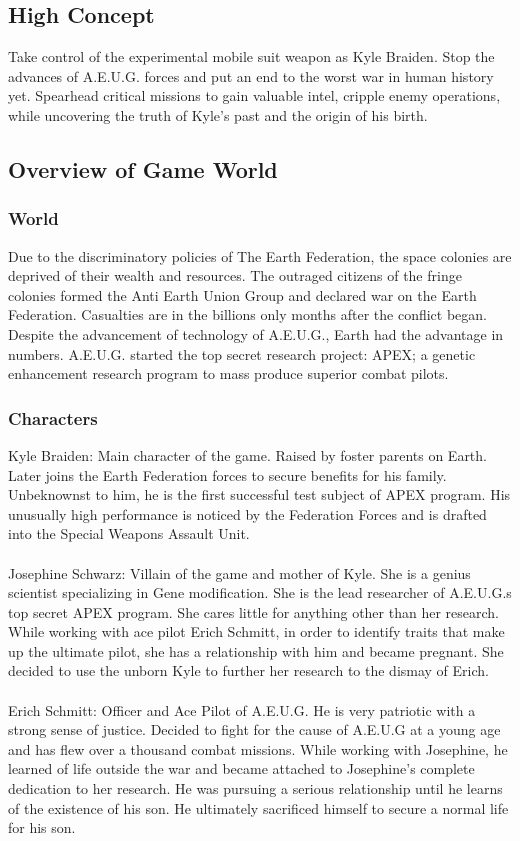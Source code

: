 \documentclass{article}
\begin{document}
\subsection*{High Concept}
Take control of the experimental mobile suit weapon as Kyle Braiden. Stop the advances of A.E.U.G. forces and put an end to the worst war in human history yet. Spearhead critical missions to gain valuable intel, cripple enemy operations, while uncovering the truth of Kyle’s past and the origin of his birth.

\subsection*{Overview of Game World}
    \subsubsection*{World}
     Due to the discriminatory policies of The Earth Federation, the space colonies are deprived of their wealth and resources. The outraged citizens of the fringe colonies formed the Anti Earth Union Group and declared war on the Earth Federation. Casualties are in the billions only months after the conflict began.
    Despite the advancement of technology of A.E.U.G., Earth had the advantage in numbers. A.E.U.G. started the top secret research project: APEX; a genetic enhancement research program to mass produce superior combat pilots.
    \subsubsection*{Characters}
    Kyle Braiden: Main character of the game. Raised by foster parents on Earth. Later joins the Earth Federation forces to secure benefits for his family. Unbeknownst to him, he is the first successful test subject of APEX program. His unusually high performance is noticed by the Federation Forces and is drafted into the Special Weapons Assault Unit.\\\\
    Josephine Schwarz: Villain of the game and mother of Kyle. She is a genius scientist specializing in Gene modification. She is the lead researcher of A.E.U.G.s top secret APEX program. She cares little for anything other than her research. While working with ace pilot Erich Schmitt, in order to identify traits that make up the ultimate pilot, she has a relationship with him and became pregnant. She decided to use the unborn Kyle to further her research to the dismay of Erich.\\\\
    Erich Schmitt: Officer and Ace Pilot of A.E.U.G. He is very patriotic with a strong sense of justice. Decided to fight for the cause of A.E.U.G at a young age and has flew over a thousand combat missions. While working with Josephine, he learned of life outside the war and became attached to Josephine’s complete dedication to her research. He was pursuing a serious relationship until he learns of the existence of his son. He ultimately sacrificed himself to secure a normal life for his son.
    
\end{document}
